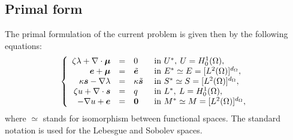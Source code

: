 \subsection{Primal form}

The primal formulation of the current problem is given then by the following equations:
$$
\left\lbrace
\begin{array}{rcll}
    \zeta\lambda+\nabla\cdot\bm{\mu} &=& 0          & \text{ in } U^*,\:     U = H^1_0(\Omega),\\
    \bm{e}+\bm{\mu}                 &=& \tilde{\bm{e}}       & \text{ in } E^* \simeq E = [L^2(\Omega)]^{d_\Omega},\\   
    \kappa\bm{s}-\nabla\lambda     &=& \kappa\tilde{\bm{s}} & \text{ in } S^* \simeq S = [L^2(\Omega)]^{d_\Omega},\\
    \zeta u+\nabla\cdot\bm{s} &=& q          & \text{ in } L^*,\:     L = H^1_0(\Omega),\\
    -\nabla u+\bm{e}          &=& \bm{0}      & \text{ in } M^* \simeq M = [L^2(\Omega)]^{d_\Omega},
\end{array}
\right.
$$
where $\simeq$ stands for isomorphism between functional spaces. The standard notation is used for the Lebesgue and Sobolev spaces.

